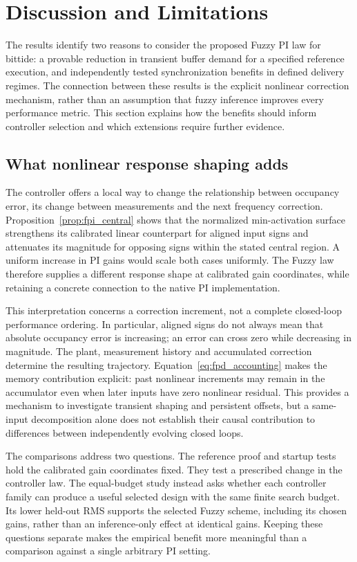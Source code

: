 \section{Discussion and Limitations}
\label{sec:discussion}

The results identify two reasons to consider the proposed Fuzzy PI law
for bittide: a provable reduction in transient buffer demand for a
specified reference execution, and independently tested synchronization
benefits in defined delivery regimes. The connection between these
results is the explicit nonlinear correction mechanism, rather than
an assumption that fuzzy inference improves every performance metric.
This section explains how the benefits should inform controller
selection and which extensions require further evidence.

\subsection{What nonlinear response shaping adds}
\label{subsec:discussion_mechanism}

The controller offers a local way to change the relationship between
occupancy error, its change between measurements and the next frequency
correction. Proposition~\ref{prop:fpi_central} shows that the normalized
min-activation surface strengthens its calibrated linear counterpart
for aligned input signs and attenuates its magnitude for opposing signs
within the stated central region. A uniform increase in PI gains would
scale both cases uniformly. The Fuzzy law therefore supplies
a different response shape at calibrated gain coordinates, while
retaining a concrete connection to the native PI implementation.

This interpretation concerns a correction increment, not a complete
closed-loop performance ordering. In particular, aligned signs do not
always mean that absolute occupancy error is increasing; an error can
cross zero while decreasing in magnitude. The plant, measurement
history and accumulated correction determine the resulting trajectory.
Equation~\eqref{eq:fpd_accounting} makes the memory contribution explicit:
past nonlinear increments may remain in the accumulator even when
later inputs have zero nonlinear residual. This provides a mechanism
to investigate transient shaping and persistent offsets, but a
same-input decomposition alone does not establish their causal
contribution to differences between independently evolving closed loops.

The comparisons address two questions. The reference proof and
startup tests hold the calibrated gain coordinates fixed. They test
a prescribed change in the controller law. The
equal-budget study instead asks whether each controller family can
produce a useful selected design with the same finite search budget.
Its lower held-out RMS supports the selected Fuzzy scheme, including
its chosen gains, rather than an inference-only effect at identical
gains. Keeping these questions separate makes the empirical benefit
more meaningful than a comparison against a single arbitrary PI setting.

